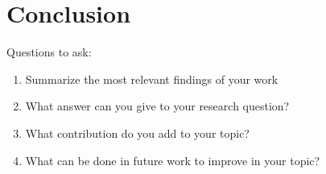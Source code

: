 \chapter{Conclusion}
\label{sec:conclusion}
Questions to ask:
\begin{enumerate}
    \item Summarize the most relevant findings of your work
    \item What answer can you give to your research question?
    \item What contribution do you add to your topic?
    \item What can be done in future work to improve in your topic?
\end{enumerate}
